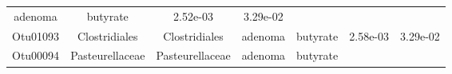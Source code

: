 \documentclass[11pt,]{article}
\begin{document}
\begin{longtable}[]{@{}ccccccc@{}}
\begin{minipage}[t]{0.09\columnwidth}
adenoma\strut
\end{minipage} & \begin{minipage}[t]{0.11\columnwidth}\centering\strut
butyrate\strut
\end{minipage} & \begin{minipage}[t]{0.09\columnwidth}\centering\strut
2.52e-03\strut
\end{minipage} & \begin{minipage}[t]{0.09\columnwidth}\centering\strut
3.29e-02\strut
\end{minipage}\tabularnewline
\begin{minipage}[t]{0.09\columnwidth}\centering\strut
Otu01093\strut
\end{minipage} & \begin{minipage}[t]{0.17\columnwidth}\centering\strut
Clostridiales\strut
\end{minipage} & \begin{minipage}[t]{0.17\columnwidth}\centering\strut
Clostridiales\strut
\end{minipage} & \begin{minipage}[t]{0.09\columnwidth}\centering\strut
adenoma\strut
\end{minipage} & \begin{minipage}[t]{0.11\columnwidth}\centering\strut
butyrate\strut
\end{minipage} & \begin{minipage}[t]{0.09\columnwidth}\centering\strut
2.58e-03\strut
\end{minipage} & \begin{minipage}[t]{0.09\columnwidth}\centering\strut
3.29e-02\strut
\end{minipage}\tabularnewline
\begin{minipage}[t]{0.09\columnwidth}\centering\strut
Otu00094\strut
\end{minipage} & \begin{minipage}[t]{0.17\columnwidth}\centering\strut
Pasteurellaceae\strut
\end{minipage} & \begin{minipage}[t]{0.17\columnwidth}\centering\strut
Pasteurellaceae\strut
\end{minipage} & \begin{minipage}[t]{0.09\columnwidth}\centering\strut
adenoma\strut
\end{minipage} & \begin{minipage}[t]{0.11\columnwidth}\centering\strut
butyrate\strut
\end{minipage} & \begin{minipage}[t]{0.09\columnwidth}\centering\strut

\end{minipage}
\end{longtable}
\end{document}
